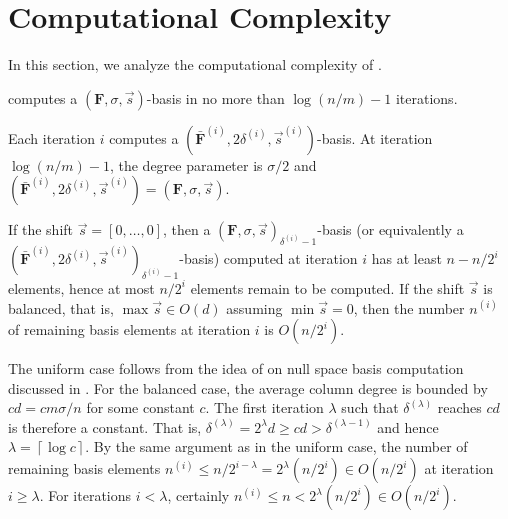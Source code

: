 
\section{Computational Complexity}

\label{sec:complexity}

In this section, we analyze the computational complexity of .
 
\begin{lem}
 computes a $\left(\mathbf{F},\sigma,\vec{s}\right)$-basis
in no more than $\log\left(n/m\right)-1$ iterations.\end{lem}
\begin{pf}
Each iteration $i$ computes a $(\bar{\mathbf{F}}^{\left(i\right)},2\delta^{\left(i\right)},\vec{s}^{\left(i\right)})$-basis.
At iteration $\log\left(n/m\right)-1$, the degree parameter is $\sigma/2$
and $(\bar{\mathbf{F}}^{\left(i\right)},2\delta^{\left(i\right)},\vec{s}^{\left(i\right)})=\left(\mathbf{F},\sigma,\vec{s}\right)$.\end{pf}
\begin{lem}
\label{lem:remainingNumberElements}If the shift $\vec{s}=\left[0,\dots,0\right]$,
then a $\left(\mathbf{F},\sigma,\vec{s}\right)_{\delta^{\left(i\right)}-1}$-basis
(or equivalently a $(\bar{\mathbf{F}}^{\left(i\right)},2\delta^{\left(i\right)},\vec{s}^{\left(i\right)})_{\delta^{\left(i\right)}-1}$-basis)
computed at iteration $i$ has at least $n-n/2^{i}$ elements, hence
at most $n/2^{i}$ elements remain to be computed. If the shift $\vec{s}$
is balanced, that is, $\max\vec{s}\in O(d)$ assuming $\min\vec{s}=0$,
then the number $n^{\left(i\right)}$ of remaining basis elements
at iteration $i$ is $O(n/2^{i})$.\end{lem}
\begin{pf}
The uniform case follows from the idea of \citet{storjohann-villard:2005}
on null space basis computation discussed in .
For the balanced case, the average column degree is bounded by $cd=cm\sigma/n$
for some constant $c$. The first iteration $\lambda$ such that $\delta^{\left(\lambda\right)}$
reaches $cd$ is therefore a constant. That is, $\delta^{\left(\lambda\right)}=2^{\lambda}d\ge cd>\delta^{\left(\lambda-1\right)}$
and hence $\lambda=\left\lceil \log c\right\rceil $. By the same
argument as in the uniform case, the number of remaining basis elements
$n^{\left(i\right)}\le n/2^{i-\lambda}=2^{\lambda}(n/2^{i})\in O(n/2^{i})$
at iteration $i\ge\lambda$. For iterations $i<\lambda$, certainly
$n^{\left(i\right)}\le n<2^{\lambda}(n/2^{i})\in O(n/2^{i})$.\end{pf}
